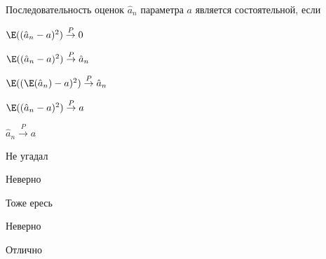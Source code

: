 
\begin{question}
Последовательность оценок \(\hat a_n\) параметра \(a\) является
состоятельной, если
\begin{answerlist}
  \item \(\E((\hat a_n - a)^2) \stackrel{P}{\to} 0\)
  \item \(\E((\hat a_n - a)^2) \stackrel{P}{\to} \hat a_n\)
  \item \(\E((\E(\hat a_n) - a)^2) \stackrel{P}{\to} \hat a_n\)
  \item \(\E((\hat a_n - a)^2) \stackrel{P}{\to} a\)
  \item \(\hat a_n \stackrel{P}{\to} a\)
\end{answerlist}
\end{question}

\begin{solution}
\begin{answerlist}
  \item Не угадал
  \item Неверно
  \item Тоже ересь
  \item Неверно
  \item Отлично
\end{answerlist}
\end{solution}

